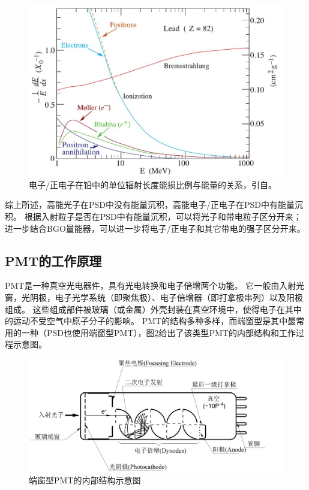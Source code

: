 \begin{figure}[h!]
\centering
\includegraphics[width=0.8\linewidth]{chap/description/fig/electron_energyloss}
\caption{电子/正电子在铅中的单位辐射长度能损比例与能量的关系，引自\parencite{pdg_book}。}
\label{fig:description:electron_energyloss}
\end{figure}

综上所述，高能光子在PSD中没有能量沉积，高能电子/正电子在PSD中有能量沉积。
根据入射粒子是否在PSD中有能量沉积，可以将光子和带电粒子区分开来；进一步结合BGO量能器，可以进一步将电子/正电子和其它带电的强子区分开来。

\subsection{PMT的工作原理}
PMT是一种真空光电器件，具有光电转换和电子倍增两个功能。
它一般由入射光窗，光阴极，电子光学系统（即聚焦极）、电子倍增器（即打拿极串列）以及阳极组成。
这些组成部件被玻璃（或金属）外壳封装在真空环境中，使得电子在其中的运动不受空气中原子分子的影响。
PMT的结构多种多样，而端窗型是其中最常用的一种（PSD也使用端窗型PMT），图\ref{fig:description:pmt_structure}给出了该类型PMT的内部结构和工作过程示意图。

\begin{figure}[h!]
\centering
\includegraphics[width=\linewidth]{chap/description/fig/pmt_structure}
\caption{端窗型PMT的内部结构示意图}
\label{fig:description:pmt_structure}
\end{figure}

